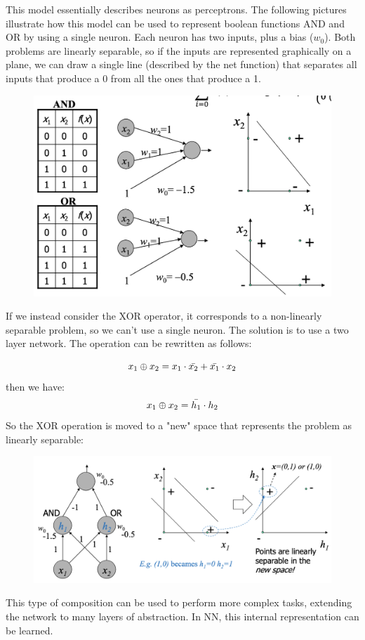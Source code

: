 This model essentially describes neurons as perceptrons. The following pictures illustrate how this model can be used to represent boolean functions AND and OR by using a single neuron. Each neuron has two inputs, plus a bias ($w_0$). Both problems are linearly separable, so if the inputs are represented graphically on a plane, we can draw a single line (described by the net function) that separates all inputs that produce a 0 from all the ones that produce a 1.

\begin{figure}[h]
    \centering
    \includegraphics[width=0.5\linewidth]{img/boolean perceptron.png}
\end{figure}

If we instead consider the XOR operator, it corresponds to a non-linearly separable problem, so we can't use a single neuron. The solution is to use a two layer network. The operation can be rewritten as follows:

\begin{equation*}
    x_1 \oplus x_2 = x_1 \cdot \Bar{x_2} + \Bar{x_1} \cdot x_2
\end{equation*}
then we have:
\begin{equation*}
    x_1 \oplus x_2 = \Bar{h_1} \cdot h_2
\end{equation*}
So the XOR operation is moved to a "new" space that represents the problem as linearly separable:

\begin{figure}[h]
    \centering
    \includegraphics[width=0.5\linewidth]{img/xor perceptron.png}
\end{figure}
This type of composition can be used to perform more complex tasks, extending the network to many layers of abstraction. In NN, this internal representation can be learned.

